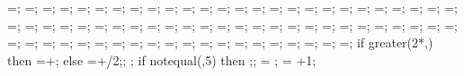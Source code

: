 {{\phorsegm=\phorsegm;
\phorsprwid=\phorsprwid;
\phorsprlinethk=\phorsprlinethk;
\phorsuppwidth=\phorsuppwidth;
\phorsuppdepth=\phorsuppdepth;
\phorsupplinethk=\phorsupplinethk;
\pverspringspace=\pverspringspace;
\pvertextshiftx=\pvertextshiftx;
\pvertextshifty=\pvertextshifty;
\pverspringlength=\pverspringlength;
\pverampl=\pverampl;
\pversegm=\pversegm;
\pverspringthk=\pverspringthk;
\pversuppwidth=\pversuppwidth;
\pversuppdepth=\pversuppdepth;
\pversupplinethk=\pversupplinethk;
\showpaxialspring=\showpaxialspring;
\paxialspringlength=\paxialspringlength;
\paxialspringsegm=\paxialspringsegm;
\paxialspringwidth=\paxialspringwidth;
\paxialspringlinethk=\paxialspringlinethk;
\paxialsuppwidth=\paxialsuppwidth;
\paxialsuppdepth=\paxialsuppdepth;
\paxialsupplinethk=\paxialsupplinethk;
\leftwspringspace=\leftwspringspace;
\leftwtextshiftx=\leftwtextshiftx;
\leftwtextshifty=\leftwtextshifty;
\leftwspringlength=\leftwspringlength;
\leftwampl=\leftwampl;
\leftwsegm=\leftwsegm;
\leftwspringthk=\leftwspringthk;
\leftwsuppwidth=\leftwsuppwidth;
\leftwsuppdepth=\leftwsuppdepth;
\leftwsupplinethk=\leftwsupplinethk;
\rightwspringspace=\rightwspringspace;
\rightwtextshiftx=\rightwtextshiftx;
\rightwtextshifty=\rightwtextshifty;
\rightwspringlength=\rightwspringlength;
\rightwampl=\rightwampl;
\rightwsegm=\rightwsegm;
\rightwspringthk=\rightwspringthk;
\rightwsuppwidth=\rightwsuppwidth;
\rightwsuppdepth=\rightwsuppdepth;
\rightwsupplinethk=\rightwsupplinethk;
\foundspringspace=\foundspringspace;
\foundtextshiftx=\foundtextshiftx;
\foundtextshifty=\foundtextshifty;
\foundspringlength=\foundspringlength;
\foundampl=\foundampl;
\foundsegm=\foundsegm;
\foundspringthk=\foundspringthk;
\foundsuppwidth=\foundsuppwidth;
\foundsuppdepth=\foundsuppdepth;
\foundsupplinethk=\foundsupplinethk;
\lefttriw=\lefttriw;
\leftlinew=\leftlinew;
\leftlined=\leftlined;
\leftlinet=\leftlinet;
\leftxvalue=\leftxvalue;
\leftyvalue=\leftyvalue;
\righttriw=\righttriw;
\rightlinew=\rightlinew;
\rightlined=\rightlined;
\rightlinet=\rightlinet;
\rightxvalue=\rightxvalue;
\rightyvalue=\rightyvalue;
\bottomtriw=\bottomtriw;
\bottomlinew=\bottomlinew;
\bottomlined=\bottomlined;
\bottomlinet=\bottomlinet;
\bottomxvalue=\bottomxvalue;
\bottomyvalue=\bottomyvalue;
if greater(2*\massrad,\collinet) then {
\latloadshift=\latloadshift+\massrad;} else {
\latloadshift=\latloadshift+\collinet/2;};
;
%
if notequal(\showsupports,5) then {;};
%
\storyminone = ;
\columnnumber = \baynumber+1; %
}}
